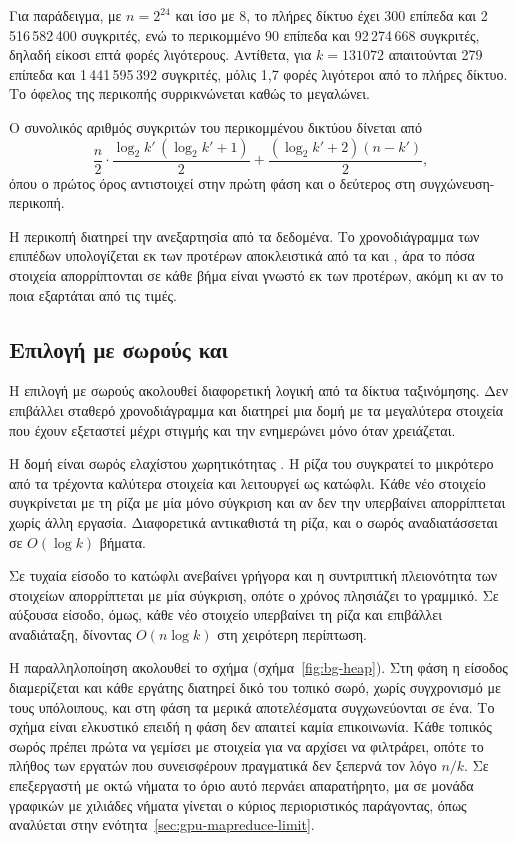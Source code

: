 Για παράδειγμα, με $n = 2^{24}$ και  ίσο με 8, το πλήρες δίκτυο έχει 300
επίπεδα και 2\,516\,582\,400 συγκριτές, ενώ το περικομμένο 90 επίπεδα και
92\,274\,668 συγκριτές, δηλαδή είκοσι επτά φορές λιγότερους. Αντίθετα, για $k =
131072$ απαιτούνται 279 επίπεδα και 1\,441\,595\,392 συγκριτές, μόλις 1,7 φορές
λιγότεροι από το πλήρες δίκτυο. Το όφελος της περικοπής συρρικνώνεται καθώς το
 μεγαλώνει.

Ο συνολικός αριθμός συγκριτών του περικομμένου δικτύου δίνεται από
\[
	\frac{n}{2} \cdot \frac{\log_2 k' \, (\log_2 k' + 1)}{2}
	+ \frac{(\log_2 k' + 2)(n - k')}{2},
\]
όπου ο πρώτος όρος αντιστοιχεί στην πρώτη φάση και ο δεύτερος στη
συγχώνευση-περικοπή.

Η περικοπή διατηρεί την ανεξαρτησία από τα δεδομένα. Το χρονοδιάγραμμα των
επιπέδων υπολογίζεται εκ των προτέρων αποκλειστικά από τα  και ,
άρα το πόσα στοιχεία απορρίπτονται σε κάθε βήμα είναι γνωστό εκ των προτέρων,
ακόμη κι αν το ποια εξαρτάται από τις τιμές.



\subsection{Επιλογή με σωρούς και }
\label{sec:bg-mapreduce}

Η επιλογή με σωρούς ακολουθεί διαφορετική λογική από τα δίκτυα ταξινόμησης. Δεν
επιβάλλει σταθερό χρονοδιάγραμμα και διατηρεί μια δομή με τα  μεγαλύτερα
στοιχεία που έχουν εξεταστεί μέχρι στιγμής και την ενημερώνει μόνο όταν
χρειάζεται.

Η δομή είναι σωρός ελαχίστου χωρητικότητας . Η ρίζα του συγκρατεί το
μικρότερο από τα  τρέχοντα καλύτερα στοιχεία και λειτουργεί ως κατώφλι.
Κάθε νέο στοιχείο συγκρίνεται με τη ρίζα με μία μόνο σύγκριση και αν δεν την
υπερβαίνει απορρίπτεται χωρίς άλλη εργασία. Διαφορετικά αντικαθιστά τη ρίζα,
και ο σωρός αναδιατάσσεται σε $O(\log k)$ βήματα.

Σε τυχαία είσοδο το κατώφλι ανεβαίνει γρήγορα και η συντριπτική πλειονότητα των
στοιχείων απορρίπτεται με μία σύγκριση, οπότε ο χρόνος πλησιάζει το γραμμικό.
Σε αύξουσα είσοδο, όμως, κάθε νέο στοιχείο υπερβαίνει τη ρίζα και επιβάλλει
αναδιάταξη, δίνοντας $O(n \log k)$ στη χειρότερη περίπτωση.

Η παραλληλοποίηση ακολουθεί το σχήμα  (σχήμα~\ref{fig:bg-heap}).
Στη φάση  η είσοδος διαμερίζεται και κάθε εργάτης διατηρεί δικό του
τοπικό σωρό, χωρίς συγχρονισμό με τους υπόλοιπους, και στη φάση  τα
μερικά αποτελέσματα συγχωνεύονται σε ένα. Το σχήμα είναι ελκυστικό επειδή η
φάση  δεν απαιτεί καμία επικοινωνία. Κάθε τοπικός σωρός πρέπει πρώτα να
γεμίσει με  στοιχεία για να αρχίσει να φιλτράρει, οπότε το πλήθος των
εργατών που συνεισφέρουν πραγματικά δεν ξεπερνά τον λόγο $n/k$. Σε επεξεργαστή
με οκτώ νήματα το όριο αυτό περνάει απαρατήρητο, μα σε μονάδα γραφικών με
χιλιάδες νήματα γίνεται ο κύριος περιοριστικός παράγοντας, όπως αναλύεται στην
ενότητα~\ref{sec:gpu-mapreduce-limit}.

